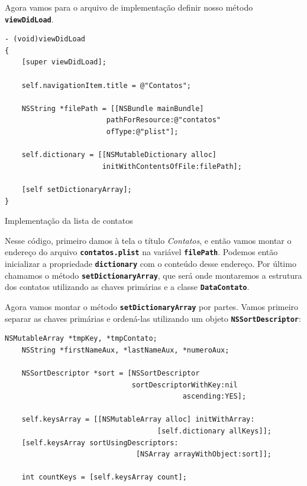 \documentclass[a4paper,12pt,brazil,doubleside]{book}
\begin{document}
\begin{singlespace}
Agora vamos para o arquivo de implementação definir nosso método \texttt{\textbf{viewDidLoad}}.

\begin{listing}[H]
\begin{verbatim}
- (void)viewDidLoad
{
    [super viewDidLoad];
    
    self.navigationItem.title = @"Contatos";
    
    NSString *filePath = [[NSBundle mainBundle]
    					pathForResource:@"contatos"
    					ofType:@"plist"];
    
    self.dictionary = [[NSMutableDictionary alloc]
    				   initWithContentsOfFile:filePath];
    
    [self setDictionaryArray];
}
\end{verbatim}
\caption{Implementação da lista de contatos}
\end{listing}


Nesse código, primeiro damos à tela o título \emph{Contatos}, e então vamos montar o endereço do arquivo \texttt{\textbf{contatos.plist}} na variável \texttt{\textbf{filePath}}. Podemos então inicializar a propriedade \texttt{\textbf{dictionary}} com o conteúdo desse endereço. Por último chamamos o método \texttt{\textbf{setDictionaryArray}}, que será onde montaremos a estrutura dos contatos utilizando as chaves primárias e a classe \texttt{\textbf{DataContato}}.

Agora vamos montar o método \texttt{\textbf{setDictionaryArray}} por partes. Vamos primeiro separar as chaves primárias e ordená-las utilizando um objeto \texttt{\textbf{NSSortDescriptor}}:

\begin{listing}[H]
\begin{verbatim}
NSMutableArray *tmpKey, *tmpContato;
    NSString *firstNameAux, *lastNameAux, *numeroAux;
    
    NSSortDescriptor *sort = [NSSortDescriptor
                              sortDescriptorWithKey:nil
                                          ascending:YES];
    
    self.keysArray = [[NSMutableArray alloc] initWithArray:
                                    [self.dictionary allKeys]];
    [self.keysArray sortUsingDescriptors:
                               [NSArray arrayWithObject:sort]];
    
    int countKeys = [self.keysArray count];


\end{verbatim}
\end{listing}
\end{singlespace}
\end{document}
